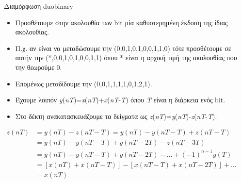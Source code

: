 \documentclass[11pt,aspectratio=169]{beamer}
\begin{document}
\begin{frame}[shrink=20,t]{Διαμόρφωση duobinary}
\begin{itemize}
\item Προσθέτουμε στην ακολουθία των bit μία καθυστερημένη έκδοση της ίδιας ακολουθίας.
\item Π.χ. αν είναι να μεταδώσουμε την (0,0,1,0,1,0,0,1,1,0) τότε προσθέτουμε σε αυτήν την (*,0,0,1,0,1,0,0,1,1) όπου * είναι η αρχική τιμή της ακολουθίας που την θεωρούμε 0.
\item Επομένως μεταδίδουμε την (0,0,1,1,1,1,0,1,2,1).
\item Έχουμε λοιπόν \textit{y}(\textit{nT})=\textit{x}(\textit{nT})+\textit{x}(\textit{nT}-\textit{T}) όπου \textit{T} είναι η διάρκεια ενός bit.
\item Στο δέκτη ανακατασκευάζουμε τα δείγματα ως \textit{z}(\textit{nT})=\textit{y}(\textit{nT})-\textit{z}(\textit{nT}-\textit{T}).
\end{itemize}
\begin{center}
$\displaystyle \begin{aligned}z(nT)&=y(nT)-z(nT-T)=y(nT)-y(nT-T)+z(nT-T)\\&=y(nT)-y(nT-T)+y(nT-2T)-z(nT-3T)\\&=y(nT)-y(nT-T)+y(nT-2T)-\dots+(-1)^{n-1}y(T)\\&=[x(nT)+x(nT-T)]-[x(nT-T)+x(nT-2T)]+\dots\\&=x(nT)\end{aligned}$\\[0.6ex]
\end{center}
\end{frame}
\end{document}
